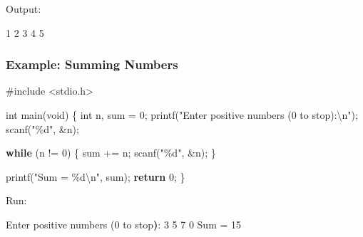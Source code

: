 \documentclass[
  letterpaper,
  DIV=11,
  numbers=noendperiod]{scrreprt}
\newenvironment{Shaded}{\begin{snugshade}}{\end{snugshade}}
\newcommand{\BuiltInTok}[1]{\textcolor[rgb]{0.00,0.23,0.31}{#1}}
\newcommand{\ControlFlowTok}[1]{\textcolor[rgb]{0.00,0.23,0.31}{\textbf{#1}}}
\newcommand{\DataTypeTok}[1]{\textcolor[rgb]{0.68,0.00,0.00}{#1}}
\newcommand{\DecValTok}[1]{\textcolor[rgb]{0.68,0.00,0.00}{#1}}
\newcommand{\ErrorTok}[1]{\textcolor[rgb]{0.68,0.00,0.00}{#1}}
\newcommand{\ExtensionTok}[1]{\textcolor[rgb]{0.00,0.23,0.31}{#1}}
\newcommand{\ImportTok}[1]{\textcolor[rgb]{0.00,0.46,0.62}{#1}}
\newcommand{\KeywordTok}[1]{\textcolor[rgb]{0.00,0.23,0.31}{\textbf{#1}}}
\newcommand{\NormalTok}[1]{\textcolor[rgb]{0.00,0.23,0.31}{#1}}
\newcommand{\OperatorTok}[1]{\textcolor[rgb]{0.37,0.37,0.37}{#1}}
\newcommand{\PreprocessorTok}[1]{\textcolor[rgb]{0.68,0.00,0.00}{#1}}
\newcommand{\SpecialCharTok}[1]{\textcolor[rgb]{0.37,0.37,0.37}{#1}}
\newcommand{\StringTok}[1]{\textcolor[rgb]{0.13,0.47,0.30}{#1}}
\begin{document}
Output:

\begin{Shaded}
\begin{Highlighting}[]
\ExtensionTok{1}
\ExtensionTok{2}
\ExtensionTok{3}
\ExtensionTok{4}
\ExtensionTok{5}
\end{Highlighting}
\end{Shaded}

\subsubsection{Example: Summing Numbers}\label{example-summing-numbers}

\begin{Shaded}
\begin{Highlighting}[]
\PreprocessorTok{\#include }\ImportTok{\textless{}stdio.h\textgreater{}}

\DataTypeTok{int}\NormalTok{ main}\OperatorTok{(}\DataTypeTok{void}\OperatorTok{)} \OperatorTok{\{}
    \DataTypeTok{int}\NormalTok{ n}\OperatorTok{,}\NormalTok{ sum }\OperatorTok{=} \DecValTok{0}\OperatorTok{;}
\NormalTok{    printf}\OperatorTok{(}\StringTok{"Enter positive numbers (0 to stop):}\SpecialCharTok{\textbackslash{}n}\StringTok{"}\OperatorTok{);}
\NormalTok{    scanf}\OperatorTok{(}\StringTok{"}\SpecialCharTok{\%d}\StringTok{"}\OperatorTok{,} \OperatorTok{\&}\NormalTok{n}\OperatorTok{);}

    \ControlFlowTok{while} \OperatorTok{(}\NormalTok{n }\OperatorTok{!=} \DecValTok{0}\OperatorTok{)} \OperatorTok{\{}
\NormalTok{        sum }\OperatorTok{+=}\NormalTok{ n}\OperatorTok{;}
\NormalTok{        scanf}\OperatorTok{(}\StringTok{"}\SpecialCharTok{\%d}\StringTok{"}\OperatorTok{,} \OperatorTok{\&}\NormalTok{n}\OperatorTok{);}
    \OperatorTok{\}}

\NormalTok{    printf}\OperatorTok{(}\StringTok{"Sum = }\SpecialCharTok{\%d\textbackslash{}n}\StringTok{"}\OperatorTok{,}\NormalTok{ sum}\OperatorTok{);}
    \ControlFlowTok{return} \DecValTok{0}\OperatorTok{;}
\OperatorTok{\}}
\end{Highlighting}
\end{Shaded}

Run:

\begin{Shaded}
\begin{Highlighting}[]
\ExtensionTok{Enter}\NormalTok{ positive numbers }\ErrorTok{(}\ExtensionTok{0}\NormalTok{ to stop}\KeywordTok{)}\BuiltInTok{:}
\ExtensionTok{3}
\ExtensionTok{5}
\ExtensionTok{7}
\ExtensionTok{0}
\ExtensionTok{Sum}\NormalTok{ = 15}
\end{Highlighting}
\end{Shaded}
\end{document}
